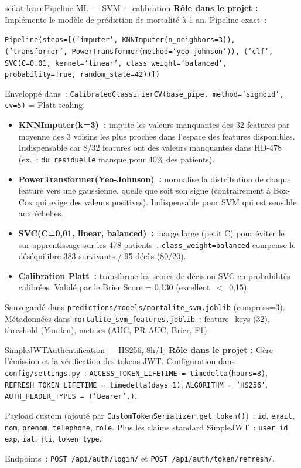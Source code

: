 \documentclass[12pt,a4paper]{article}
\begin{document}
\begin{toolbox}{scikit-learn}{Pipeline ML --- SVM + calibration}
\textbf{Rôle dans le projet :} Implémente le modèle de prédiction de mortalité
à 1 an. Pipeline exact~:

\texttt{Pipeline(steps=[('imputer', KNNImputer(n\_neighbors=3)), ('transformer',
PowerTransformer(method='yeo-johnson')), ('clf', SVC(C=0.01, kernel='linear',
class\_weight='balanced', probability=True, random\_state=42))])}

Enveloppé dans~:
\texttt{CalibratedClassifierCV(base\_pipe, method='sigmoid', cv=5)} = Platt scaling.

\begin{itemize}[leftmargin=1.5em, itemsep=2pt]
  \item \textbf{KNNImputer(k=3)~:} impute les valeurs manquantes des 32 features
    par moyenne des 3 voisins les plus proches dans l'espace des features
    disponibles. Indispensable car 8/32 features ont des valeurs manquantes dans
    HD-478 (ex.~: \texttt{du\_residuelle} manque pour 40\% des patients).
  \item \textbf{PowerTransformer(Yeo-Johnson)~:} normalise la distribution de
    chaque feature vers une gaussienne, quelle que soit son signe (contrairement
    à Box-Cox qui exige des valeurs positives). Indispensable pour SVM qui est
    sensible aux échelles.
  \item \textbf{SVC(C=0{,}01, linear, balanced)~:} marge large (petit C) pour
    éviter le sur-apprentissage sur les 478 patients~; \texttt{class\_weight=balanced}
    compense le déséquilibre 383 survivants / 95 décès (80/20).
  \item \textbf{Calibration Platt~:} transforme les scores de décision SVC en
    probabilités calibrées. Validé par le Brier Score = 0{,}130 (excellent~$<$~0{,}15).
\end{itemize}
Sauvegardé dans \texttt{predictions/models/mortalite\_svm.joblib} (compress=3).
Métadonnées dans \texttt{mortalite\_svm\_features.joblib}~:
feature\_keys (32), threshold (Youden), metrics (AUC, PR-AUC, Brier, F1).
\end{toolbox}

\begin{toolbox}{SimpleJWT}{Authentification --- HS256, 8h/1j}
\textbf{Rôle dans le projet :} Gère l'émission et la vérification des tokens JWT.
Configuration dans \texttt{config/settings.py}~:
\texttt{ACCESS\_TOKEN\_LIFETIME = timedelta(hours=8)},
\texttt{REFRESH\_TOKEN\_LIFETIME = timedelta(days=1)},
\texttt{ALGORITHM = 'HS256'}, \texttt{AUTH\_HEADER\_TYPES = ('Bearer',)}.

Payload custom (ajouté par \texttt{CustomTokenSerializer.get\_token()})~:
\texttt{id}, \texttt{email}, \texttt{nom}, \texttt{prenom}, \texttt{telephone},
\texttt{role}. Plus les claims standard SimpleJWT~: \texttt{user\_id},
\texttt{exp}, \texttt{iat}, \texttt{jti}, \texttt{token\_type}.

Endpoints~: \texttt{POST /api/auth/login/} et
\texttt{POST /api/auth/token/refresh/}.
\end{toolbox}
\end{document}

